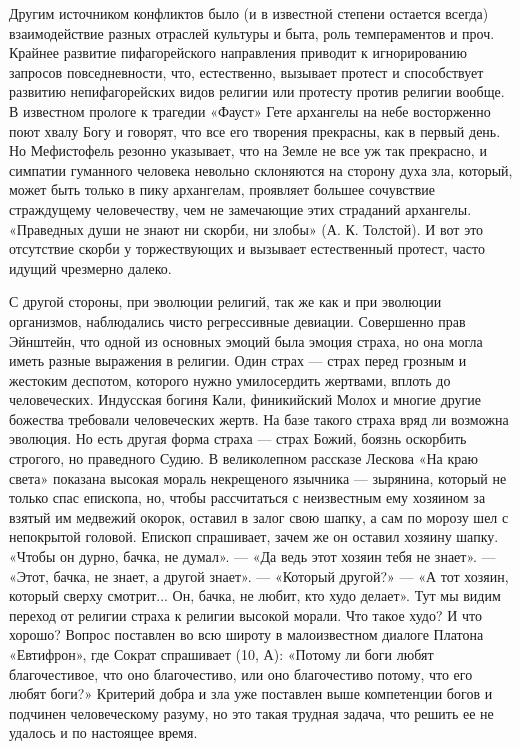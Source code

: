 Другим источником конфликтов было (и в известной степени остается всегда)
взаимодействие разных отраслей культуры и быта, роль темпераментов и проч.
Крайнее развитие пифагорейского направления приводит к игнорированию запросов
повседневности, что, естественно, вызывает протест и способствует развитию
непифагорейских видов религии или протесту против религии вообще. В известном
прологе к трагедии «Фауст» Гете архангелы на небе восторженно поют хвалу Богу и
говорят, что все его творения прекрасны, как в первый день. Но Мефистофель
резонно указывает, что на Земле не все уж так прекрасно, и симпатии гуманного
человека невольно склоняются на сторону духа зла, который, может быть только в
пику архангелам, проявляет большее сочувствие страждущему человечеству, чем не
замечающие этих страданий архангелы. «Праведных души не знают ни скорби, ни
злобы» (А. К. Толстой). И вот это отсутствие скорби у торжествующих и вызывает
естественный протест, часто идущий чрезмерно далеко.

С другой стороны, при эволюции религий, так же как и при эволюции организмов,
наблюдались чисто регрессивные девиации. Совершенно прав Эйнштейн, что одной из
основных эмоций была эмоция страха, но она могла иметь разные выражения в
религии. Один страх --- страх перед грозным и жестоким деспотом, которого нужно
умилосердить жертвами, вплоть до человеческих. Индусская богиня Кали,
финикийский Молох и многие другие божества требовали человеческих жертв. На
базе такого страха вряд ли возможна эволюция. Но есть другая форма страха ---
страх Божий, боязнь оскорбить строгого, но праведного Судию. В великолепном
рассказе Лескова «На краю света» показана высокая мораль некрещеного язычника ---
зырянина, который не только спас епископа, но, чтобы рассчитаться с неизвестным
ему хозяином за взятый им медвежий окорок, оставил в залог свою шапку, а сам по
морозу шел с непокрытой головой. Епископ спрашивает, зачем же он оставил
хозяину шапку. «Чтобы он дурно, бачка, не думал». --- «Да ведь этот хозяин тебя
не знает». --- «Этот, бачка, не знает, а другой знает». --- «Который другой?» --- «А
тот хозяин, который сверху смотрит... Он, бачка, не любит, кто худо делает».
Тут мы видим переход от религии страха к религии высокой морали. Что такое
худо? И что хорошо? Вопрос поставлен во всю широту в малоизвестном диалоге
Платона «Евтифрон», где Сократ спрашивает (10, А): «Потому ли боги любят
благочестивое, что оно благочестиво, или оно благочестиво потому, что его любят
боги?» Критерий добра и зла уже поставлен выше компетенции богов и подчинен
человеческому разуму, но это такая трудная задача, что решить ее не удалось и
по настоящее время.

